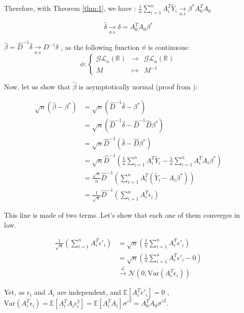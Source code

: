 Therefore, with Theorem \ref{thm:1}, we have :  $\frac{1}{n} \sum_{i=1}^{n} A_i ^T \tilde{Y_i} \underset{a.s}{\rightarrow}  \beta ^*  A_0 ^T A_0 $

\[
\hat{\delta}   \underset{a.s}{\rightarrow}  \delta = A_0 ^T A_0 \beta^*
\] 

$ \hat{\beta} = \hat{D}^{-1} \hat{\delta}  \underset{a.s}{\rightarrow}  D^{-1} \delta $ , as the following function $\phi$ is continuous:
\[
\phi: \left\{
\begin{array}{rcl}
\mathcal{GL}_n(\mathbb{R}) & \to & \mathcal{GL}_n(\mathbb{R}) \\
M & \mapsto & M^{-1}
\end{array}
\right.
\]


Now, let us show that $\hat{\beta}$ is asymptotically normal (proof from \cite{powellasymptoticsforleastsquares}): 

\begin{align*}
    \sqrt{n} ( \hat{\beta} - \beta ^* ) &= \sqrt{n} (\hat{D}^{-1} \hat{\delta} - \beta ^* ) \\
     &= \sqrt{n} (\hat{D}^{-1} \hat{\delta} - \hat{D}^{-1} \hat{D} \beta ^* ) \\
     &= \sqrt{n} \hat{D}^{-1} (\hat{\delta} -  \hat{D} \beta ^* )  \\
     &= \sqrt{n} \hat{D}^{-1} \left( \frac{1}{n} \sum_{i=1}^{n} A_i ^T \tilde{Y_i} - \frac{1}{n}  \sum_{i=1}^{n}  A_i ^T A_i \beta ^* \right)  \\
     &= \frac{\sqrt{n}}{n} \hat{D}^{-1} \left( \sum_{i=1}^{n} A_i ^T (\tilde{Y_i} -    A_i \beta ^* ) \right)   \\
     &= \frac{1}{\sqrt{n}}  \hat{D} ^{-1} \left( \sum_{i=1}^{n}  A_i ^T \epsilon _ i \right)  
\end{align*}

This line is made of two terms. Let's show that each one of them converges in law. 

\begin{align*}
    \frac{1}{\sqrt{n}} \left( \sum_{i=1}^{n}  A_i^T \epsilon'_i \right) &= \sqrt{n} \left( \frac{1}{n} \sum_{i=1}^{n}  A_i^T \epsilon'_i \right) \\
    &= \sqrt{n} \left( \frac{1}{n} \sum_{i=1}^{n}  A_i^T \epsilon'_i - 0 \right) \\
    &\xrightarrow{\mathcal{L}} \mathcal{N}(0, \text{Var}(A_i^T \epsilon_i) )
\end{align*}


Yet, as $\epsilon_i $ and $  A_i $ are independent, and $\mathbb{E} [ A_i^T \epsilon'_i] = 0 $ , $\text{Var}(A_i^T \epsilon_i) = \mathbb{E}[A_i ^T A_i \epsilon_i ^2 ] = \mathbb{E} [ A_i ^T A_i ] \sigma'^2 =A_0^T A_0 \sigma'^2  $. 

